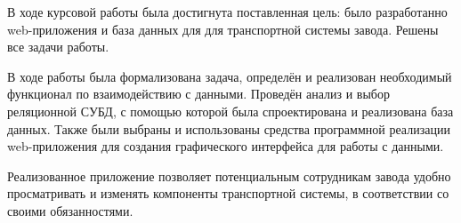 В ходе курсовой работы была достигнута поставленная цель: было разработанно web-приложения и база данных для для транспортной системы завода. Решены все задачи работы.

В ходе работы была формализована задача, определён и реализован необходимый функционал по взаимодействию с данными. Проведён анализ и выбор реляционной СУБД, с помощью которой была спроектирована и реализована база данных. Также были выбраны и использованы средства программной реализации web-приложения для создания графического интерфейса для работы с данными.

Реализованное приложение позволяет потенциальным сотрудникам завода удобно просматривать и изменять компоненты транспортной системы, в соответствии со своими обязанностями.

